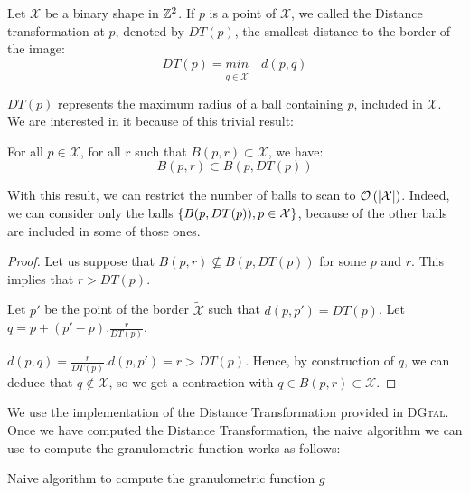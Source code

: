 \begin{definition}
Let $\mathcal{X}$ be a binary shape in $\mathbb{Z}^{2}$. If $p$ is a point of $\mathcal{X}$, we called the Distance transformation at $p$, denoted by $DT(p)$, the smallest distance to the border of the image:
$$ DT(p) = \underset{q \in \widetilde{\mathcal{X}}}{min} \quad d(p,q) $$
\end{definition}

$DT(p)$ represents the maximum radius of a ball containing $p$, included in $\mathcal{X}$. We are interested in it because of this trivial result:

\begin{theoreme}
	For all $p \in \mathcal{X}$, for all $r$ such that $B(p,r) \subset \mathcal{X}$, we have:
		$$ B(p,r) \subset B(p,DT(p))$$
\label{theoremDT}
\end{theoreme}

With this result, we can restrict the number of balls to scan to $\mathcal O \left( \left| \mathcal{X} \right| \right)$. Indeed, we can consider only the balls $\left\{ B(p,DT(p)), p \in \mathcal{X} \right\}$, because of the other balls are included in some of those ones.

\begin{proof}
	
Let us suppose that $B(p,r) \nsubseteq B(p,DT(p))$ for some $p$ and $r$. This implies that $r > DT(p)$.

Let $p'$ be the point of the border $\widetilde{\mathcal{X}}$ such that $d(p,p') = DT(p)$. Let $q = p + (p'-p).\frac{r}{DT(p)}.$ 

$d(p,q) = \frac{r}{DT(p)}.d(p,p') = r > DT(p)$. Hence, by construction of $q$, we can deduce that $q \notin \mathcal{X}$, so we get a contraction with $q \in B(p,r) \subset \mathcal{X}$. 

\end{proof}

We use the implementation of the Distance Transformation provided in \textsc{DGtal}. Once we have computed the Distance Transformation, the naive algorithm we can use to compute the granulometric function works as follows:

\IncMargin{1em}
\begin{algorithm}
\caption{Naive algorithm to compute the granulometric function $g$}
\label{algo-naive}
\end{algorithm}

